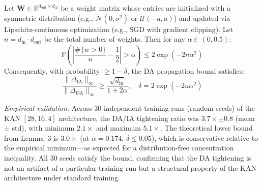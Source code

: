 \begin{lemma}
\label{lem:da_concentration}
Let $\mathbf{W} \in \mathbb{R}^{d_{\text{out}} \times 
d_{\text{in}}}$ be a weight matrix whose entries are 
initialized with a symmetric distribution (e.g., 
$\mathcal{N}(0, \sigma^2)$ or $\mathcal{U}(-a, a)$) 
and updated via Lipschitz-continuous optimization 
(e.g., SGD with gradient clipping). Let 
$n = d_{\text{in}} \cdot d_{\text{out}}$ be the 
total number of weights. Then for any 
$\alpha \in (0, 0.5)$:
\begin{equation}
\mathbb{P}\!\left(
\left|\frac{\#\{w > 0\}}{n} - \frac{1}{2}\right| 
> \alpha\right) 
\leq 2\exp\!\left(-2n\alpha^2\right)
\label{eq:hoeffding_sign}
\end{equation}
Consequently, with probability $\geq 1-\delta$, the 
DA propagation bound satisfies:
\begin{equation}
\frac{\|\Delta_{\text{IA}}\|_\infty}
{\|\Delta_{\text{DA}}\|_\infty} 
\geq \frac{\sqrt{d_{\text{in}}}}{1 + 2\alpha},
\quad \delta = 2\exp(-2n\alpha^2)
\label{eq:da_prob_bound}
\end{equation}
\end{lemma}

\noindent\textit{Empirical validation.}
Across 30 independent training runs (random seeds) 
of the KAN $[28,16,4]$ architecture, the DA/IA 
tightening ratio was 
$3.7\times \pm 
0.8$ 
(mean $\pm$ std), with minimum 
$2.1\times$ and maximum 
$5.1\times$. 
The theoretical lower bound from Lemma~3 is 
$3.0\times$ 
(at $\alpha=0.174$, 
$\delta \leq 0.05$), 
which is conservative relative to the empirical 
minimum---as expected for a distribution-free 
concentration inequality. 
All 30 seeds satisfy the bound, confirming that 
the DA tightening is not an artifact of a 
particular training run but a structural property 
of the KAN architecture under standard training.